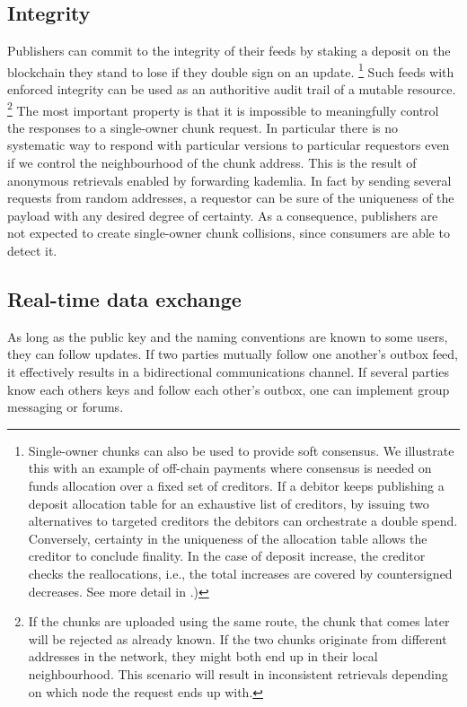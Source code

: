 \subsection{Integrity}\label{sec:feed-integrity}

Publishers can commit to the integrity of their feeds by staking a deposit on the blockchain they stand to  lose if they double sign on an update.%
%
\footnote{Single-owner chunks can also be used to provide soft consensus. We illustrate this with an example of off-chain payments where  consensus  is needed on funds allocation over a fixed set of creditors. If a debitor keeps publishing a deposit allocation table for an exhaustive list of creditors, by issuing two alternatives to targeted creditors the debitors can orchestrate a double spend. Conversely, certainty in the uniqueness of the allocation table allows the creditor to conclude finality. In the case of deposit increase, the creditor checks the reallocations, i.e., the total increases are covered by countersigned decreases. See more  detail in \cite{tronetal-sw3games}.)}
%
Such feeds with enforced integrity can be used as an authoritive audit trail of a mutable resource.%
%
\footnote{If the chunks are uploaded using the same route, the chunk that comes later will be rejected as already known. If the two chunks originate from different addresses in the network, they might both end up in their local neighbourhood. This scenario will result in inconsistent retrievals depending on which node the request ends up with.}
%
The most important property is that it is impossible to meaningfully control the responses to a single-owner chunk request. In particular there is no systematic way to respond with particular versions to particular requestors even if we control the neighbourhood of the chunk  address. This is the result of anonymous retrievals enabled by forwarding kademlia. In fact by sending several requests from random addresses, a requestor can be sure of the uniqueness of the payload with any desired degree of certainty. 
As a consequence, publishers are not expected to create single-owner chunk collisions, since consumers are able to detect it.  



\subsection{Real-time data exchange}\label{sec:real-time-data-exchange}

As long as the public key and the naming conventions are known to some users, they can follow updates. If two parties mutually follow one another's outbox feed, it effectively results in a bidirectional communications channel. If several parties know each others keys and follow each other's outbox, one can implement group messaging or forums. 

